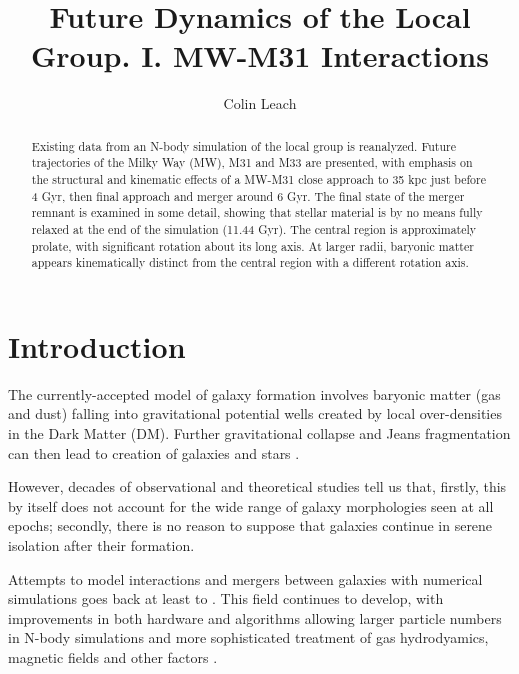 \documentclass[twocolumn]{aastex63}
\newcommand{\todo}{\color{red}{TODO}\color{black}\hspace{2mm}}
\begin{document}
	
\title{Future Dynamics of the Local Group. I. MW-M31 Interactions}

\author[0000-0003-3608-1546]{Colin Leach}

\begin{abstract}
	
Existing data from an N-body simulation of the local group is reanalyzed. Future trajectories of the Milky Way (MW), M31 and M33 are presented, with emphasis on the structural and kinematic effects of a MW-M31 close approach to 35 kpc just before 4 Gyr, then final approach and merger around 6 Gyr. The final state of the merger remnant is examined in some detail, showing that stellar material is by no means fully relaxed at the end of the simulation (11.44 Gyr). The central region is approximately prolate, with significant rotation about its long axis. At larger radii, baryonic matter appears kinematically distinct from the central region with a different rotation axis. \vspace{5mm}
	
\todo{Add further concise and intelligent summary of the paper, once I get a clearer idea what it will include (and how to seem intelligent).}\vspace{5mm}

	
\end{abstract}




\section{Introduction}

The currently-accepted model of galaxy formation involves baryonic matter (gas and dust) falling into gravitational potential wells created by local over-densities in the Dark Matter (DM). Further gravitational collapse and Jeans fragmentation can then lead to creation of galaxies and stars \citep{mo_galaxy_2010}.

However, decades of observational and theoretical studies tell us that, firstly, this by itself does not account for the wide range of galaxy morphologies seen at all epochs; secondly, there is no reason to suppose that galaxies continue in serene isolation after their formation.

Attempts to model interactions and mergers between galaxies with numerical simulations goes back at least to \citet{toomre_galactic_1972}. This field continues to develop, with improvements in both hardware and algorithms allowing larger particle numbers in N-body simulations and more sophisticated treatment of gas hydrodyamics, magnetic fields and other factors \citep{bodenheimer_numerical_2007}.
\end{document}

